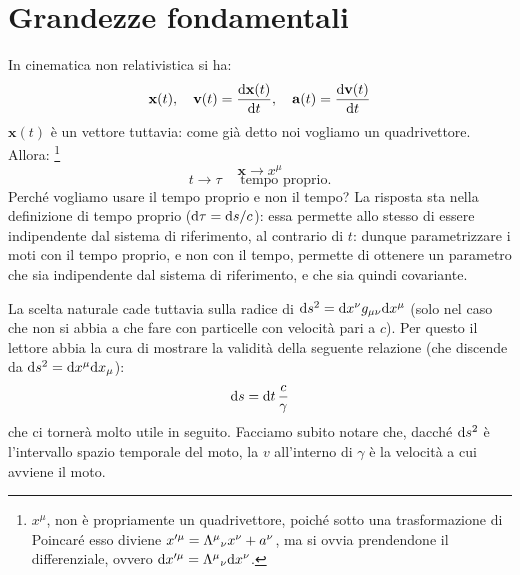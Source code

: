 \section{ Grandezze fondamentali}
\begin{osservazione} In cinematica non relativistica si ha:
\begin{displaymath}
 \mathbf{x}(t),\quad
 \mathbf{v}(t)=\frac{\mathrm{d}\mathbf{x}(t)}{\mathrm{d}t},\quad
 \mathbf{a}(t)=\frac{\mathrm{d}\mathbf{v}(t)}{\mathrm{d}t}
\end{displaymath}
$\mathbf{x}(t)$ \`e un vettore tuttavia: come gi\`a detto noi
vogliamo un quadrivettore. Allora:%
\footnote{\(x^\mu\), non \`e propriamente un quadrivettore, poich\'e
 sotto
una trasformazione di Poincar\'e esso diviene
 $x'^{\mu}=\Lambda^{\mu}{}_{\nu}x^{\nu}+a^{\nu}$, ma si ovvia 
prendendone il dif\mbox{}ferenziale, ovvero
 $\mathrm{d}x'^{\mu}=\Lambda^{\mu}{}_{\nu}\mathrm{d}x^{\nu}$.}
\begin{equation}
 \mathbf{x}\rightarrow x^{\mu}
\end{equation}
\begin{equation}
 t\rightarrow\tau \quad\mbox{ tempo proprio.}
\end{equation}
Perch\'e vogliamo usare il tempo proprio e non il tempo? La risposta sta
 nella definizione di tempo proprio (\(\mathrm{d} \tau = \mathrm{d} s /c\)): essa
 permette allo stesso di essere indipendente dal sistema di riferimento,
 al contrario di \(t\): dunque parametrizzare i moti con il tempo
 proprio, e non con il tempo, permette di ottenere un parametro che sia
 indipendente dal sistema di riferimento, e che sia quindi covariante.

 La scelta naturale cade tuttavia sulla radice di $\mathrm{d} s^2=\mathrm{d}
x^{\nu}g_{\mu\nu}\mathrm{d} x^{\mu}$ (solo nel caso che non si abbia a che fare
con particelle con velocit\`a pari a $c$). Per questo il lettore abbia
la cura di mostrare la validit\`a della seguente relazione (che discende
da \(\mathrm{d} s^2 = \mathrm{d} x^{\mu}\mathrm{d} x_{\mu}\)):
\begin{equation}
 \mathrm{d} s=\mathrm{d} t\, \frac{c}{\gamma}
\end{equation}
che ci torner\`a molto utile in seguito. Facciamo subito notare che,
 dacch\'e $\mathrm{d} s^2$ \`e l'intervallo spazio temporale del moto, la $v$
 all'interno di $\gamma$ \`e la velocit\`a a cui avviene il moto.
\end{osservazione}
